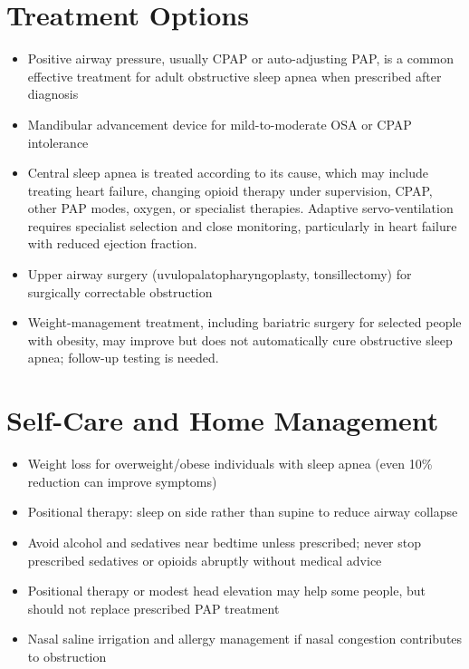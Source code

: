 \section*{Treatment Options}
\begin{itemize}
 \item Positive airway pressure, usually CPAP or auto-adjusting PAP, is a common effective treatment for adult obstructive sleep apnea when prescribed after diagnosis
 \item Mandibular advancement device for mild-to-moderate OSA or CPAP intolerance
 \item Central sleep apnea is treated according to its cause, which may include treating heart failure, changing opioid therapy under supervision, CPAP, other PAP modes, oxygen, or specialist therapies. Adaptive servo-ventilation requires specialist selection and close monitoring, particularly in heart failure with reduced ejection fraction.
 \item Upper airway surgery (uvulopalatopharyngoplasty, tonsillectomy) for surgically correctable obstruction
 \item Weight-management treatment, including bariatric surgery for selected people with obesity, may improve but does not automatically cure obstructive sleep apnea; follow-up testing is needed.
\end{itemize}

\section*{Self-Care and Home Management}
\begin{itemize}
 \item Weight loss for overweight/obese individuals with sleep apnea (even 10\% reduction can improve symptoms)
 \item Positional therapy: sleep on side rather than supine to reduce airway collapse
 \item Avoid alcohol and sedatives near bedtime unless prescribed; never stop prescribed sedatives or opioids abruptly without medical advice
 \item Positional therapy or modest head elevation may help some people, but should not replace prescribed PAP treatment
 \item Nasal saline irrigation and allergy management if nasal congestion contributes to obstruction
\end{itemize}

